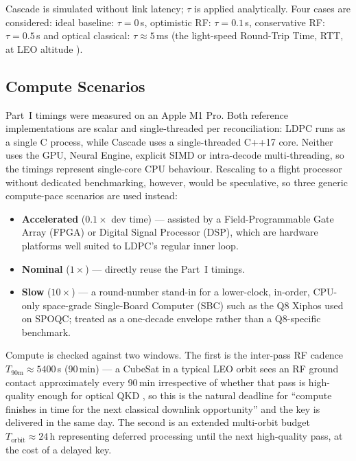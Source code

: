 \documentclass{UoYCSproject}
\begin{document}
Cascade is simulated without link latency; $\tau$ is applied analytically.
Four cases are considered: ideal baseline: $\tau = 0$\,s, optimistic RF:
$\tau = 0.1$\,s, conservative RF: $\tau = 0.5$\,s and optical classical:
$\tau \approx 5$\,ms (the light-speed Round-Trip Time, RTT, at LEO
altitude \cite{conde_round_2024}).

\subsection{Compute Scenarios}
\label{subsec:meth-compute-scenarios}

Part~I timings were measured on an Apple M1 Pro. Both reference
implementations are scalar and single-threaded per reconciliation: LDPC runs as
a single C process, while Cascade uses a single-threaded C++17 core. Neither
uses the GPU, Neural Engine, explicit SIMD or intra-decode multi-threading, so
the timings represent single-core CPU behaviour. 
Rescaling to a flight processor without dedicated benchmarking, however,
would be speculative, so three generic compute-pace scenarios are used instead:
\begin{itemize}
    \item \textbf{Accelerated} ($0.1\times$ dev time) --- assisted by a
    Field-Programmable Gate Array (FPGA) or Digital Signal Processor (DSP),
    which are hardware platforms well suited to LDPC's regular inner loop.
    \item \textbf{Nominal} ($1\times$) --- directly reuse the Part~I timings.
    \item \textbf{Slow} ($10\times$) --- a round-number stand-in for a
    lower-clock, in-order, CPU-only space-grade Single-Board Computer
    (SBC) such as the Q8 Xiphos used on SPOQC; treated as a one-decade
    envelope rather than a Q8-specific benchmark.
\end{itemize}
Compute is checked against two windows. The first is the inter-pass RF
cadence $T_{\text{90m}} \approx 5400$\,s (90\,min) --- a CubeSat in a
typical LEO orbit sees an RF ground contact approximately every 90\,min
irrespective of whether that pass is high-quality enough for optical QKD
\cite{noauthor_hubs_nodate}, so this is the natural deadline for
``compute finishes in time for the next classical downlink opportunity''
and the key is delivered in the same day. The second is an extended
multi-orbit budget $T_{\text{orbit}} \approx 24$\,h representing
deferred processing until the next high-quality pass, at the cost of a
delayed key.
\end{document}
